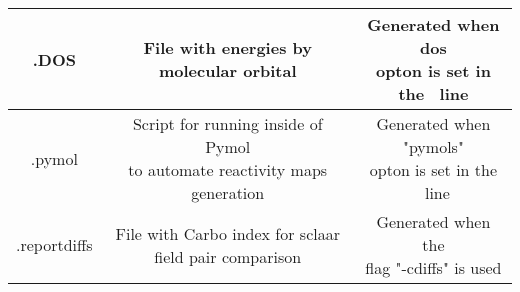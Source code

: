 \documentclass[a4paper,11pt]{refart}
\begin{document}
\begin{minipage}{\fullwidth}
\begin{table}[H]
\begin{tabular}{c|c|c}
			.DOS& File with energies by molecular orbital  & \makecell{Generated when dos \\ opton is set in the \ line} \\ \hline
			.pymol	&  \makecell{Script for running inside of Pymol \\to automate reactivity maps generation}   &  \makecell{Generated when "pymols" \\ opton is set in the \ line} \\ \hline
			.reportdiffs &  File with Carbo index for sclaar field pair comparison & \makecell{ Generated when the\\ flag "-cdiffs" is used }\\ 
			\bottomrule
		\end{tabular} 
		\label{tab4}	
	\end{table}	
\end{minipage}








\newpage






\end{document}
